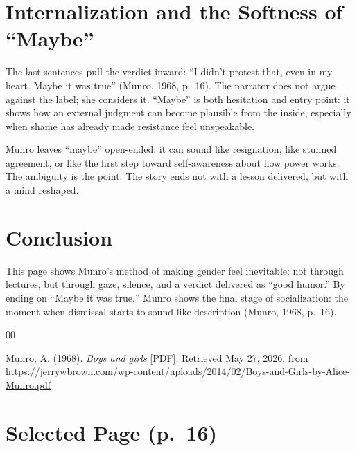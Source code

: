 \documentclass[12pt]{article}
\begin{document}
\section{Internalization and the Softness of ``Maybe''}
The last sentences pull the verdict inward: ``I didn't protest that, even in my heart. Maybe it was true'' (Munro, 1968, p.~16). The narrator does not argue against the label; she considers it. ``Maybe'' is both hesitation and entry point: it shows how an external judgment can become plausible from the inside, especially when shame has already made resistance feel unspeakable.

Munro leaves ``maybe'' open-ended: it can sound like resignation, like stunned agreement, or like the first step toward self-awareness about how power works. The ambiguity is the point. The story ends not with a lesson delivered, but with a mind reshaped.

\section{Conclusion}
This page shows Munro's method of making gender feel inevitable: not through lectures, but through gaze, silence, and a verdict delivered as ``good humor.'' By ending on ``Maybe it was true,'' Munro shows the final stage of socialization: the moment when dismissal starts to sound like description (Munro, 1968, p.~16).

\begin{thebibliography}{00}

Munro, A. (1968). \textit{Boys and girls} [PDF]. Retrieved May 27, 2026, from \url{https://jerrywbrown.com/wp-content/uploads/2014/02/Boys-and-Girls-by-Alice-Munro.pdf}

\end{thebibliography}

\clearpage
\appendix
\section*{Selected Page (p.~16)}

\end{document}

